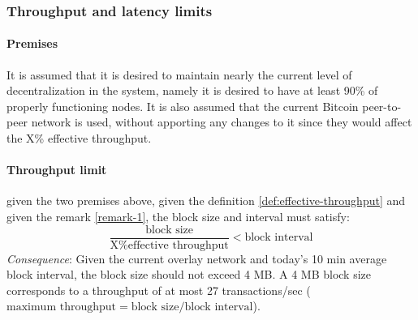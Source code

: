 
\subsubsection{Throughput and latency limits}

\paragraph{Premises} It is assumed that it is desired to maintain nearly the
current level of decentralization in the system, namely it is desired to have at
least 90\% of properly functioning nodes. It is also assumed that the current
Bitcoin peer-to-peer network is used, without apporting any changes to it since
they would affect the X\% effective throughput.

\paragraph{Throughput limit} given the two premises above, given the definition
\ref{def:effective-throughput} and given the remark \ref{remark-1}, the block size and
interval must satisfy:
\[ \frac{\text{block size}}{\text{X\% effective throughput}} < \text{block interval} \]
\emph{Consequence}: Given the current overlay network and today’s 10 min average
block interval, the block size should not exceed 4 MB. A 4 MB block size
corresponds to a throughput of at most 27 transactions/sec ($\text{maximum throughput} =
\text{block size} / \text{block interval}$).
